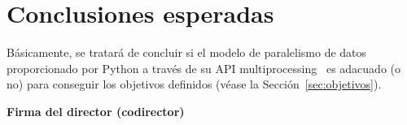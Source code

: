 \documentclass[titlepage, 12pt, a4paper, oneside]{article}
\begin{document}
\section{Conclusiones esperadas}
\label{sec:conclusiones}
Básicamente, se tratará de concluir si el modelo de paralelismo de
datos proporcionado por Python a través de su API
multiprocessing~\cite{multiprocessing} es adacuado (o no) para
conseguir los objetivos definidos (véase la
Sección~\ref{sec:objetivos}).




\begin{center}
  \textbf{Firma del director (codirector)}
\end{center}
\end{document}
